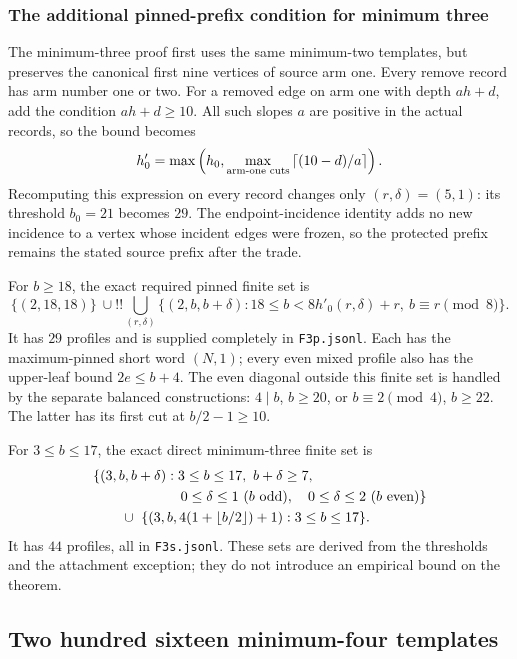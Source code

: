 \subsubsection{The additional pinned-prefix condition for minimum three}
\label{templates:min3-protection}

The minimum-three proof first uses the same minimum-two templates,
but preserves the canonical first nine vertices of source arm one.
Every remove record has arm number one or two.  For a removed edge
on arm one with depth $ah+d$, add the condition $ah+d\ge10$.
All such slopes $a$ are positive in the actual records, so the bound
becomes
\[
 h'_0=\max\left(h_0,\max_{\text{arm-one cuts}}
                      \left\lceil (10-d)/a\right\rceil\right).
\]
Recomputing this expression on every record changes only
$(r,\delta)=(5,1)$: its threshold $b_0=21$ becomes $29$.
The endpoint-incidence identity adds no new incidence to a vertex
whose incident edges were frozen, so the protected prefix remains
the stated source prefix after the trade.

For $b\ge18$, the exact required pinned finite set is
\[
 \{(2,18,18)\}\ \cup\!!!
 \bigcup_{(r,\delta)}
 \{(2,b,b+\delta):18\le b<8h'_0(r,\delta)+r,\ b\equiv r\pmod8\}.
\]
It has $29$ profiles and is supplied completely in
\texttt{F3p.jsonl}.  Each has the maximum-pinned short word $(N,1)$;
every even mixed profile also has the upper-leaf bound $2e\le b+4$.
The even diagonal outside this finite set is handled by the separate
balanced constructions: $4\mid b$, $b\ge20$, or
$b\equiv2\pmod4$, $b\ge22$.  The latter has its first cut at
$b/2-1\ge10$.

For $3\le b\le17$, the exact direct minimum-three finite set is
\begin{align*}
 &\{(3,b,b+\delta):3\le b\le17,\ b+\delta\ge7,\\
 &\hspace{22mm}0\le\delta\le1\ (b\text{ odd}),\quad
                    0\le\delta\le2\ (b\text{ even})\}\\
 &\qquad\cup\ \{(3,b,4(1+\floor{b/2})+1):3\le b\le17\}.
\end{align*}
It has $44$ profiles, all in \texttt{F3s.jsonl}.  These sets are
derived from the thresholds and the attachment exception; they do
not introduce an empirical bound on the theorem.

\subsection{Two hundred sixteen minimum-four templates}
\label{templates:min4}

